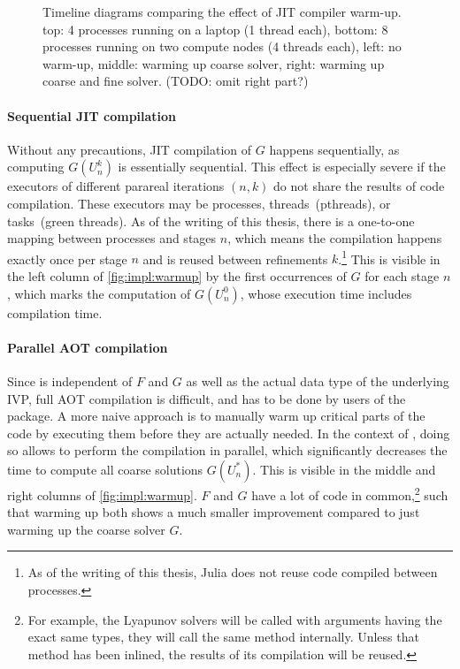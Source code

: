 \begin{figure}[htb]
  \caption[Timeline diagrams comparing the effect of JIT compiler warm-up.]{%
    Timeline diagrams comparing the effect of \acs{JIT} compiler warm-up.
    top: 4 processes running on a laptop (1 thread each),
    bottom: 8 processes running on two compute nodes (4 threads each),
    left: no warm-up,
    middle: warming up coarse solver,
    right: warming up coarse and fine solver.
    (TODO: omit right part?)
  }
  \label{fig:impl:warmup}
\end{figure}

\paragraph{Sequential \ac{JIT} compilation}

Without any precautions,
\ac{JIT} compilation of $G$ happens sequentially,
as computing $G(U_n^k)$ is essentially sequential.
This effect is especially severe if the executors of different parareal iterations $(n,k)$ do not share the results of code compilation.
These executors may be processes, threads~(pthreads), or tasks~(green threads).
As of the writing of this thesis,
there is a one-to-one mapping between processes and stages $n$,
which means the compilation happens exactly once per stage $n$ and is reused between refinements $k$.\footnote{%
  As of the writing of this thesis, Julia does not reuse code compiled between processes.
}
This is visible in the left column of \autoref{fig:impl:warmup}
by the first occurrences of $G$ for each stage $n$,
which marks the computation of $G(U_n^0)$,
whose execution time includes compilation time.

\paragraph{Parallel \acs{AOT} compilation}

Since  is independent of $F$ and $G$ as well as the actual data type of the underlying \ac{IVP},
full \ac{AOT} compilation is difficult, and has to be done by users of the package.
A more naive approach is to manually warm up critical parts of the code by executing them before they are actually needed.
In the context of ,
doing so allows to perform the compilation in parallel,
which significantly decreases the time to compute all coarse solutions $G(U_n^*)$.
This is visible in the middle and right columns of \autoref{fig:impl:warmup}.
$F$ and $G$ have a lot of code in common,\footnote{%
  For example, the Lyapunov solvers will be called with arguments having the exact same types,
  \ie they will call the same method internally.
  Unless that method has been inlined, the results of its compilation will be reused.
}
such that warming up both shows a much smaller improvement compared to just warming up the coarse solver $G$.

